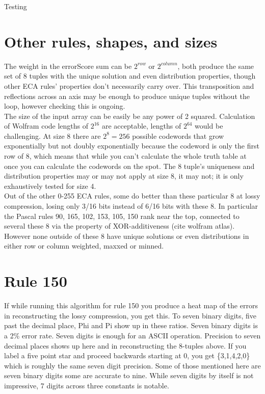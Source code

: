 \documentclass[11pt]{article}
\begin{document}
Testing

\section{Other rules, shapes, and sizes}

The weight in the errorScore sum can be $2^{row}$ or $2^{column}$, both produce the same set of 8 tuples with the unique solution and even distribution properties, though other ECA rules' properties don't necessarily carry over. This transposition and reflections across an axis may be enough to produce unique tuples without the loop, however checking this is ongoing.\\

The size of the input array can be easily be any power of 2 squared. Calculation of Wolfram code lengths of $2^{16}$ are acceptable, lengths of $2^{64}$ would be challenging. At size 8 there are $2^8=256$ possible codewords that grow exponentially but not doubly exponentially because the codeword is only the first row of 8, which means that while you can't calculate the whole truth table at once you can calculate the codewords on the spot. The 8 tuple's uniqueness and distribution properties may or may not apply at size 8, it may not; it is only exhaustively tested for size 4.\\

Out of the other 0-255 ECA rules, some do better than these particular 8 at lossy compression, losing only 3/16 bits instead of 6/16 bits with these 8. In particular the Pascal rules 90, 165, 102, 153, 105, 150 rank near the top, connected to several these 8 via the property of XOR-additiveness (cite wolfram atlas). However none outside of these 8 have unique solutions or even distributions in either row or column weighted, maxxed or minned.\\

\section{Rule 150}

If while running this algorithm for rule 150 you produce a heat map of the errors in reconstructing the lossy compression, you get this. To seven binary digits, five past the decimal place, Phi and Pi show up in these ratios. Seven binary digits is a 2\% error rate. Seven digits is enough for an ASCII operation. Precision to seven decimal places shows up here and in reconstructing the 8-tuples above. If you label a five point star and proceed backwards starting at 0, you get \{3,1,4,2,0\} which is roughly the same seven digit precision. Some of those mentioned here are seven binary digits some are accurate to nine. While seven digits by itself is not impressive, 7 digits across three constants is notable.\\
\end{document}
